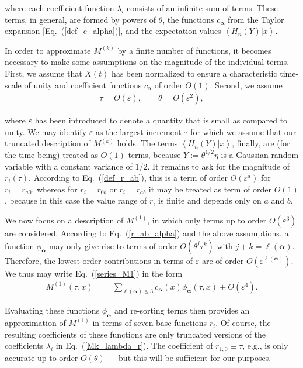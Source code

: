 \documentclass[aps,twocolumn,superscriptaddress,showpacs,showkeys]{revtex4}
\newcommand{\eps}{\varepsilon}
\newcommand{\vecalpha}{{\boldsymbol{\alpha}}}
\begin{document}
\noindent where each coefficient function $\lambda_i$ consists of an infinite sum of terms. These terms, in general,
are formed by powers of $\theta$, the functions $c_\vecalpha$ from the Taylor expansion [Eq.~(\ref{def_c_alpha})],
and the expectation values $\left<H_n(Y)|x\right>$.

In order to approximate $M^{(k)}$ by a finite number of functions, it becomes necessary to make some assumptions on
the magnitude of the individual terms. First, we assume that $X(t)$ has been normalized to ensure a characteristic
time-scale of unity and coefficient functions $c_\alpha$ of order $O(1)$. Second, we assume
%
\begin{eqnarray}\label{magnitude_theta}
\tau = O(\eps),\qquad \theta = O(\eps^2),
\end{eqnarray}

\noindent where $\eps$ has been introduced to denote a quantity that is small as compared to unity. We may identify
$\eps$ as the largest increment $\tau$ for which we assume that our truncated description of $M^{(k)}$ holds. The terms
$\left<H_n(Y)|x\right>$, finally, are (for the time being) treated as $O(1)$ terms, because $Y:=\theta^{1/2}\eta$ is
a Gaussian random variable with a constant variance of $1/2$.
It remains to ask for the magnitude of $r_i(\tau)$. According to Eq.~(\ref{def_r_ab}), this is a term of
order $O(\eps^a)$ for $r_i=r_{a0}$, whereas for $r_i=r_{0b}$ or $r_i=r_{ab}$ it may be treated as term of order $O(1)$,
because in this case the value range of $r_i$ is finite and depends only on $a$ and $b$.

We now focus on a description of $M^{(1)}$, in which only terms up to order $O(\eps^3)$ are considered.
According to Eq.~(\ref{r_ab_alpha}) and the above assumptions, a function $\phi_\vecalpha$ may only give rise to terms of
order $O(\theta^j\tau^k)$ with $j+k=\ell(\vecalpha)$. Therefore, the lowest order contributions in terms of $\eps$ are of order
$O(\eps^{\ell(\vecalpha)})$. We thus may write Eq.~(\ref{series_M1}) in the form
%
\begin{eqnarray}
M^{(1)}(\tau,x) &=& \sum_{\ell(\vecalpha)\le 3} \!c_\vecalpha(x) \phi_\vecalpha(\tau,x)+O(\eps^4).
\end{eqnarray}

\noindent Evaluating these functions $\phi_\vecalpha$ and re-sorting terms then provides
an approximation of $M^{(1)}$ in terms of seven base functions $r_i$. Of course, the resulting coefficients of these
functions are only truncated versions of the coefficients $\lambda_i$ in Eq.~(\ref{Mk_lambda_r}). The coefficient of
$r_{1,0}\equiv\tau$, e.g., is only accurate up to order $O(\theta)$ --- but this will be sufficient for our purposes.
\end{document}
